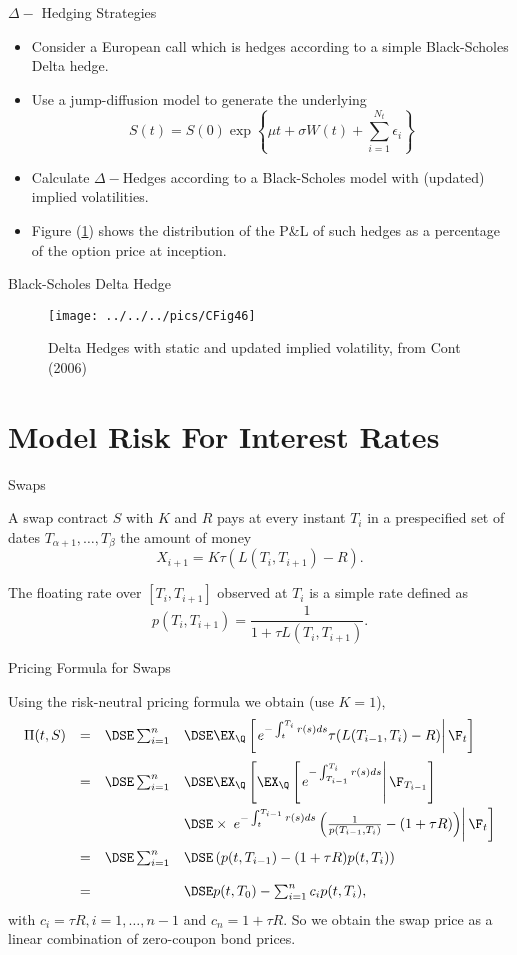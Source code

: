 {$\Delta-$ Hedging Strategies}
\begin{itemize}
\item<1-> Consider a European call which is hedges according to a simple Black-Scholes Delta hedge.
\item<2->
Use a jump-diffusion model to generate the underlying
$$
 S(t)=S(0) \exp\left\{\mu t + \sigma  W(t) + \sum_{i=1}^{N_t} \epsilon_i\right\}
$$
\item<3->
Calculate $\Delta-$Hedges according to a Black-Scholes model with (updated) implied volatilities.
\item<4->
Figure (\ref{CFig46}) shows the distribution of the P\&L of such hedges as a percentage of the option price at inception.
\end{itemize}




{Black-Scholes Delta Hedge}
\begin{figure}[htp]
\centering
\texttt{[image: ../../../pics/CFig46]}
\caption{Delta Hedges with static and updated implied volatility, from Cont (2006)}\label{CFig46}
\end{figure}


\section{Model Risk For Interest Rates}


{ Swaps}

A swap contract $S$ with $K$ and $R$ pays
at every instant $T_i$ in a prespecified set of dates
$T_{\alpha+1},\ldots ,T_{\beta}$
 the amount of money
$$
X_{i+1} = K \tau(L(T_i,T_{i+1})-R).
$$

The floating rate over $[T_i, T_{i+1}]$ observed at $T_i$ is a
simple rate defined as
$$
p(T_i, T_{i+1}) = \frac{1}{1 + \tau L(T_i,T_{i+1})}.
$$






{Pricing Formula for  Swaps}

Using the risk-neutral pricing  formula we obtain (use $K=1$),
{\tiny
$$
\begin{array}{llll}
\Pi(t,S) &=& \DSE \sum_{i=1}^n &\DSE \EX_{\Q}\left[\left.e^{-
\int_t^{T_i} r(s)ds} \tau(L(T_{i-1},T_{i})-R)\right|\F_t\right]\\*[12pt]
&=&\DSE \sum_{i=1}^n &\DSE \EX_{\Q}\left[\EX_{\Q}\left[\left.e^{-
\int_{T_{i-1}}^{T_i}
r(s)ds}\right|\F_{T_{i-1}}\right]\right.\\*[12pt] & & &\DSE \times
\left. \left.e^{- \int_t^{T_{i-1}} r(s)ds}
\left(\frac{1}{p(T_{i-1},T_i)}-(1+ \tau
R)\right)\right|\F_t\right]\\*[12pt] &=&\DSE \sum_{i=1}^n &\DSE
\left( p(t,T_{i-1})-(1 + \tau R) p(t,T_i)\right) \\*[12pt]
&=&&\DSE p(t,T_0) -
\sum_{i=1}^n c_i p(t,T_i),
\end{array}
$$
}
with $c_i=\tau R, i=1, \ldots, n-1$ and $c_n = 1+\tau R$. So we obtain the
swap price as a linear combination of zero-coupon bond prices.






